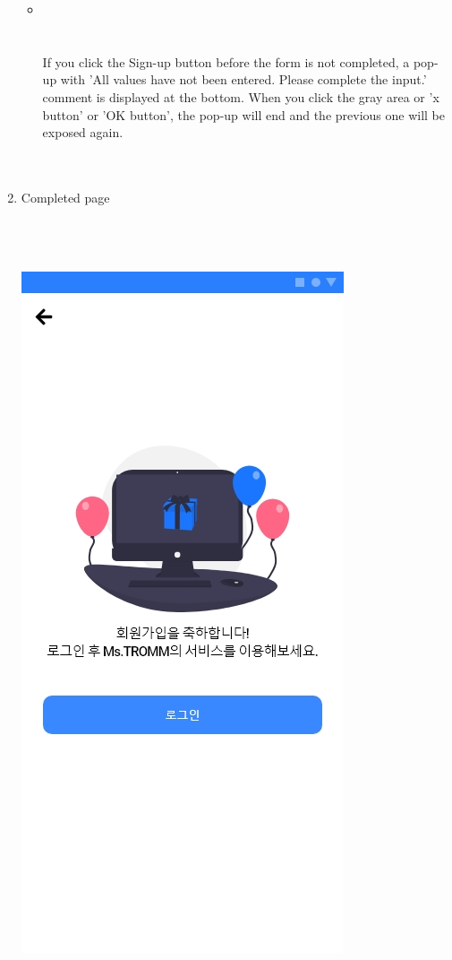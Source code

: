 \documentclass[conference]{IEEEtran}
\begin{document}
\begin{enumerate}
    \begin{itemize}
        \item[] \\ \\ \\ If you click the Sign-up button before the form is not completed, a pop-up with ’All values have not been entered. Please complete the input.' comment is displayed at the bottom. When you click the gray area or 'x button' or 'OK button', the pop-up will end and the previous one will be exposed again.\\ \\ \\
    \end{itemize}
    \item Completed page \\ \\ \\ \\
    \centerline{\includegraphics[scale=0.32]{4-4. 회원가입 완료.jpg}}

\end{enumerate}
\end{document}
